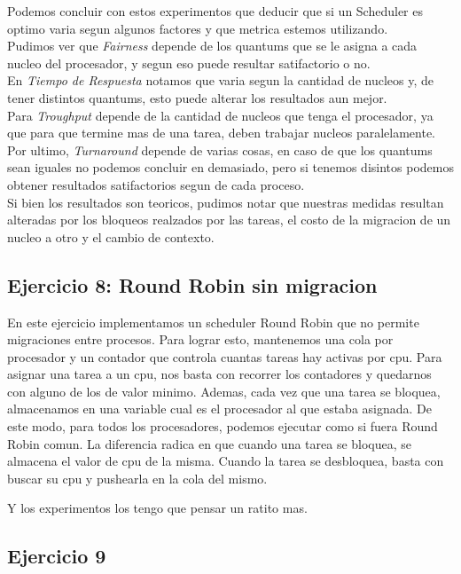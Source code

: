 \vspace{0,5 cm}
Podemos concluir con estos experimentos que deducir que si un Scheduler es optimo varia segun algunos factores y que metrica estemos utilizando.\\
Pudimos ver que \textit{Fairness} depende de los quantums que se le asigna a cada nucleo del procesador, y segun eso puede resultar satifactorio o no.\\
En \textit{Tiempo de Respuesta} notamos que varia segun la cantidad de nucleos y, de tener distintos quantums, esto puede alterar los resultados aun mejor.\\
Para \textit{Troughput} depende de la cantidad de nucleos que tenga el procesador, ya que para que termine mas de una tarea, deben trabajar nucleos paralelamente.\\
Por ultimo, \textit{Turnaround} depende de varias cosas, en caso de que los quantums sean iguales no podemos concluir en demasiado, pero si tenemos disintos podemos obtener resultados satifactorios segun de cada proceso.\\
Si bien los resultados son teoricos, pudimos notar que nuestras medidas resultan alteradas por los bloqueos realzados por las tareas, el costo de la migracion de un nucleo a otro y el cambio de contexto.



\subsection{Ejercicio 8: Round Robin sin migracion}

En este ejercicio implementamos un scheduler Round Robin que no permite migraciones entre procesos. Para lograr esto, mantenemos una
cola por procesador 
y un contador que controla cuantas tareas hay activas por cpu. Para asignar una tarea a un cpu, nos basta con recorrer los contadores 
y quedarnos con alguno
de los de valor minimo. Ademas, cada vez que una tarea se bloquea, almacenamos en una variable cual
es el procesador al que estaba asignada. De este modo, para todos los procesadores, podemos ejecutar como si fuera Round Robin comun. La diferencia
radica en que cuando una tarea se bloquea, se almacena el valor de cpu de la misma. Cuando la tarea se desbloquea, basta con buscar su
cpu y pushearla en la cola del mismo.

Y los experimentos los tengo que pensar un ratito mas.

\subsection{Ejercicio 9}

